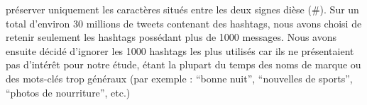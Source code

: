 pr\'eserver uniquement les caract\`eres situ\'es entre les deux signes
di\`ese (\#). Sur un total d{\textquoteright}environ 30 millions de
tweets contenant des hashtags, nous avons choisi de retenir seulement
les hashtags poss\'edant plus de 1000 messages. Nous avons ensuite
d\'ecid\'e d{\textquoteright}ignorer les 1000 hashtags les plus
utilis\'es car ils ne pr\'esentaient pas d{\textquoteright}int\'er\^et
pour notre \'etude, \'etant la plupart du temps des noms de marque ou
des mots-cl\'es trop g\'en\'eraux (par exemple :
{\textquotedblleft}bonne nuit{\textquotedblright},
{\textquotedblleft}nouvelles de sports{\textquotedblright},
{\textquotedblleft}photos de nourriture{\textquotedblright}, etc.) 



\begin{figure}
    \centering
    



\end{figure}
